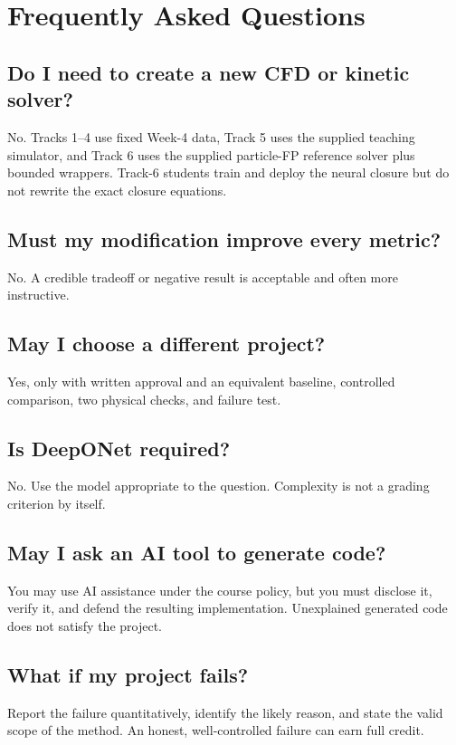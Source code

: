 \documentclass[11pt]{article}
\begin{document}
\section{Frequently Asked Questions}
\subsection*{Do I need to create a new CFD or kinetic solver?}
No. Tracks 1--4 use fixed Week-4 data, Track 5 uses the supplied teaching simulator, and Track 6 uses the supplied particle-FP reference solver plus bounded wrappers. Track-6 students train and deploy the neural closure but do not rewrite the exact closure equations.

\subsection*{Must my modification improve every metric?}
No. A credible tradeoff or negative result is acceptable and often more instructive.

\subsection*{May I choose a different project?}
Yes, only with written approval and an equivalent baseline, controlled comparison, two physical checks, and failure test.

\subsection*{Is DeepONet required?}
No. Use the model appropriate to the question. Complexity is not a grading criterion by itself.

\subsection*{May I ask an AI tool to generate code?}
You may use AI assistance under the course policy, but you must disclose it, verify it, and defend the resulting implementation. Unexplained generated code does not satisfy the project.

\subsection*{What if my project fails?}
Report the failure quantitatively, identify the likely reason, and state the valid scope of the method. An honest, well-controlled failure can earn full credit.
\end{document}
